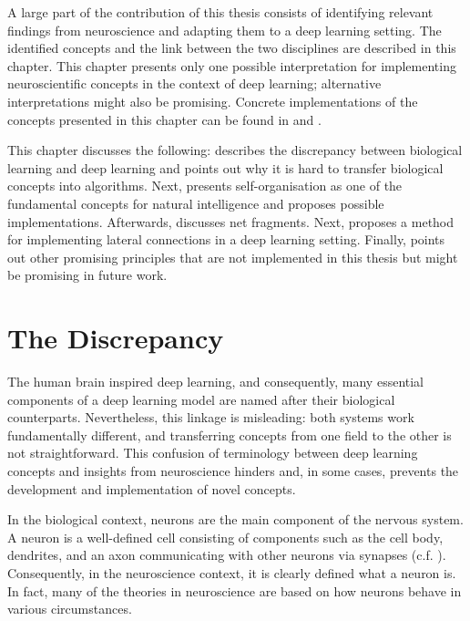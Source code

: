 A large part of the contribution of this thesis consists of identifying relevant findings from neuroscience and adapting them to a deep learning setting.
The identified concepts and the link between the two disciplines are described in this chapter.
This chapter presents only one possible interpretation for implementing neuroscientific concepts in the context of deep learning; alternative interpretations might also be promising.
Concrete implementations of the concepts presented in this chapter can be found in  and .

This chapter discusses the following:
 describes the discrepancy between biological learning and deep learning and points out why it is hard to transfer biological concepts into algorithms. Next,  presents self-organisation as one of the fundamental concepts for natural intelligence and proposes possible implementations.
Afterwards,  discusses net fragments. Next,  proposes a method for implementing lateral connections in a deep learning setting. Finally,  points out other promising principles that are not implemented in this thesis but might be promising in future work.


\section{The Discrepancy}
The human brain inspired deep learning, and consequently, many essential components of a deep learning model are named after their biological counterparts. Nevertheless, this linkage is misleading: both systems work fundamentally different, and transferring concepts from one field to the other is not straightforward. This confusion of terminology between deep learning concepts and insights from neuroscience hinders and, in some cases, prevents the development and implementation of novel concepts. 

In the biological context, neurons are the main component of the nervous system.
A neuron is a well-defined cell consisting of components such as the cell body, dendrites, and an axon communicating with other neurons via synapses (c.f. ).
Consequently, in the neuroscience context, it is clearly defined what a neuron is. In fact, many of the theories in neuroscience are based on how neurons behave in various circumstances. 

